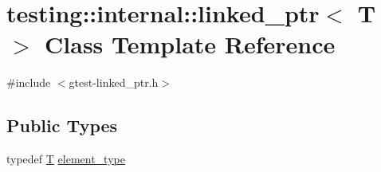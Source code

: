 \hypertarget{classtesting_1_1internal_1_1linked__ptr}{}\section{testing\+:\+:internal\+:\+:linked\+\_\+ptr$<$ T $>$ Class Template Reference}
\label{classtesting_1_1internal_1_1linked__ptr}


{\ttfamily \#include $<$gtest-\/linked\+\_\+ptr.\+h$>$}

\subsection*{Public Types}
\begin{DoxyCompactItemize}
\item 
typedef \hyperlink{functions__7_8js_adf1f3edb9115acb0a1e04209b7a9937b}{T} \hyperlink{classtesting_1_1internal_1_1linked__ptr_a295c7d1ee4100d916514c4e4385a0063}{element\+\_\+type}
\end{DoxyCompactItemize}
